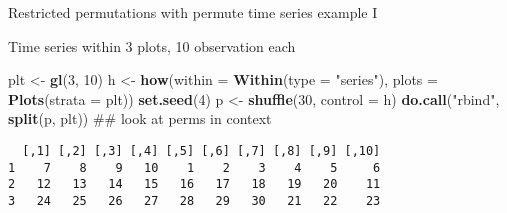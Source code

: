 \documentclass[10pt,ignorenonframetext,compress, aspectratio=169]{beamer}
\newenvironment{Shaded}{\begin{snugshade}}{\end{snugshade}}
\newcommand{\KeywordTok}[1]{\textcolor[rgb]{0.13,0.29,0.53}{\textbf{{#1}}}}
\newcommand{\DataTypeTok}[1]{\textcolor[rgb]{0.13,0.29,0.53}{{#1}}}
\newcommand{\DecValTok}[1]{\textcolor[rgb]{0.00,0.00,0.81}{{#1}}}
\newcommand{\StringTok}[1]{\textcolor[rgb]{0.31,0.60,0.02}{{#1}}}
\newcommand{\NormalTok}[1]{{#1}}
\begin{document}
\begin{frame}[fragile]{Restricted permutations with permute \textbar{}
time series example I}

Time series within 3 plots, 10 observation each

\scriptsize

\begin{Shaded}
\begin{Highlighting}[]
\NormalTok{plt <-}\StringTok{ }\KeywordTok{gl}\NormalTok{(}\DecValTok{3}\NormalTok{, }\DecValTok{10}\NormalTok{)}
\NormalTok{h <-}\StringTok{ }\KeywordTok{how}\NormalTok{(}\DataTypeTok{within =} \KeywordTok{Within}\NormalTok{(}\DataTypeTok{type =} \StringTok{"series"}\NormalTok{), }\DataTypeTok{plots =} \KeywordTok{Plots}\NormalTok{(}\DataTypeTok{strata =} \NormalTok{plt))}
\KeywordTok{set.seed}\NormalTok{(}\DecValTok{4}\NormalTok{)}
\NormalTok{p <-}\StringTok{ }\KeywordTok{shuffle}\NormalTok{(}\DecValTok{30}\NormalTok{, }\DataTypeTok{control =} \NormalTok{h)}
\KeywordTok{do.call}\NormalTok{(}\StringTok{"rbind"}\NormalTok{, }\KeywordTok{split}\NormalTok{(p, plt)) ## look at perms in context}
\end{Highlighting}
\end{Shaded}

\begin{verbatim}
  [,1] [,2] [,3] [,4] [,5] [,6] [,7] [,8] [,9] [,10]
1    7    8    9   10    1    2    3    4    5     6
2   12   13   14   15   16   17   18   19   20    11
3   24   25   26   27   28   29   30   21   22    23
\end{verbatim}

\normalsize

\end{frame}
\end{document}
